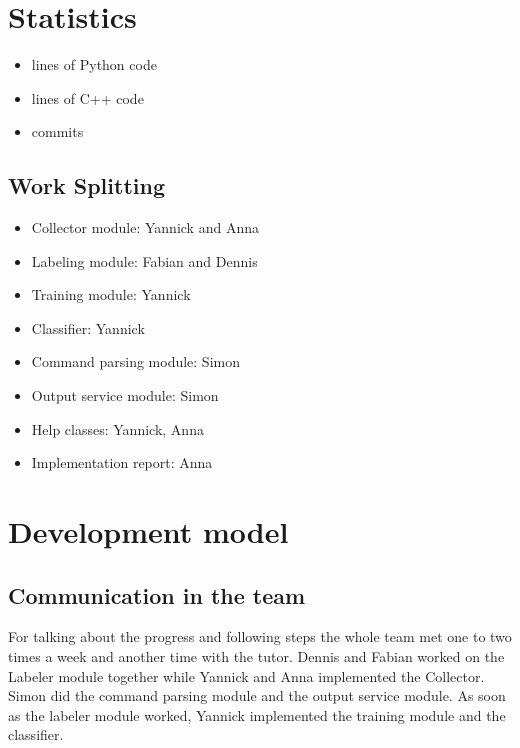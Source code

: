 \documentclass[parskip=full]{scrartcl}
\begin{document}
\section{Statistics}

\begin{itemize}

\item lines of Python code

\item lines of C++ code

\item commits

\end{itemize}
\subsection{Work Splitting}
\begin{itemize}

\item Collector module: Yannick and Anna

\item Labeling module: Fabian and Dennis

\item Training module: Yannick

\item Classifier: Yannick

\item Command parsing module: Simon

\item Output service module: Simon

\item Help classes: Yannick, Anna

\item Implementation report: Anna

\end{itemize}

\section{Development model}
\subsection{Communication in the team}
For talking about the progress and following steps the whole team met one to two times a week and another time with the tutor.
Dennis and Fabian worked on the Labeler module together while Yannick and Anna implemented the Collector.
Simon did the command parsing module and the output service module.
As soon as the labeler module worked, Yannick implemented the training module and the classifier.
\end{document}
